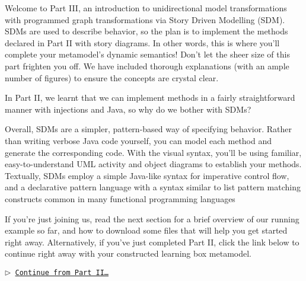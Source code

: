 \genHeader
{}

Welcome to Part III, an introduction to unidirectional model transformations with programmed graph transformations via Story Driven Modelling (SDM).
SDMs are used to describe behavior, so the plan is to implement the methods declared in Part II with story diagrams. In other words,
this is where you'll complete your metamodel's dynamic semantics! Don't let the sheer size of this part frighten you off. We have included thorough
explanations (with an ample number of figures) to ensure the concepts are crystal clear.

In Part II, we learnt that we can implement methods in a fairly straightforward manner with injections and Java, so why do we bother with SDMs?

Overall, SDMs are a simpler, pattern-based way of specifying behavior. Rather than writing verbose Java code yourself, you can model each method and generate
the corresponding code. With the visual syntax, you'll be using familiar, easy-to-understand UML activity and object diagrams to establish your methods.
Textually, SDMs employ a simple Java-like syntax for imperative control flow, and a declarative pattern language with a syntax similar to list pattern matching
constructs common in many functional programming languages

If you're just joining us, read the next section for a brief overview of our running example so far, and how to download some files that will help you get
started right away. Alternatively, if you've just completed Part II, click the link below to continue right away with your constructed learning box metamodel.

\begin{center}\texttt{$\triangleright$ \hyperlink{explanation}{Continue from Part II\ldots}}\end{center}
